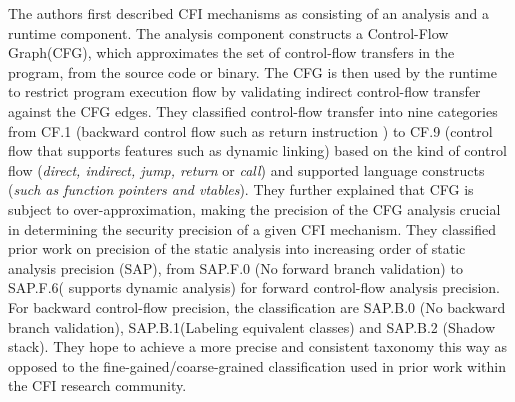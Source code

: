 \documentclass[dvips,12pt]{article}
\begin{document}
The authors first described CFI mechanisms as consisting of an analysis and a runtime component. The analysis component constructs a Control-Flow Graph(CFG), which approximates the set of control-flow transfers in the program, from the source code or binary. The CFG is then used by the runtime to restrict program execution flow by validating indirect control-flow transfer against the CFG edges. They classified control-flow transfer into nine categories from CF.1 (backward control flow such as return instruction ) to CF.9 (control flow that supports features such as dynamic linking) based on the kind of control flow (\textit{direct, indirect, jump, return} or \textit{call}) and supported language constructs (\textit{such as function pointers and vtables}). They further explained that CFG is subject to over-approximation, making the precision of the CFG analysis crucial in determining the security precision of a given CFI mechanism. They classified prior work on precision of the static analysis into increasing order of static analysis precision (SAP), from SAP.F.0 (No forward branch validation) to SAP.F.6( supports dynamic analysis) for forward control-flow analysis precision. For backward control-flow precision, the classification are SAP.B.0 (No backward branch validation), SAP.B.1(Labeling equivalent classes) and SAP.B.2 (Shadow stack). They hope to achieve a more precise and consistent taxonomy this way as opposed to the fine-gained/coarse-grained classification used in prior work within the CFI research community.  
\newline
\newline
\end{document}
